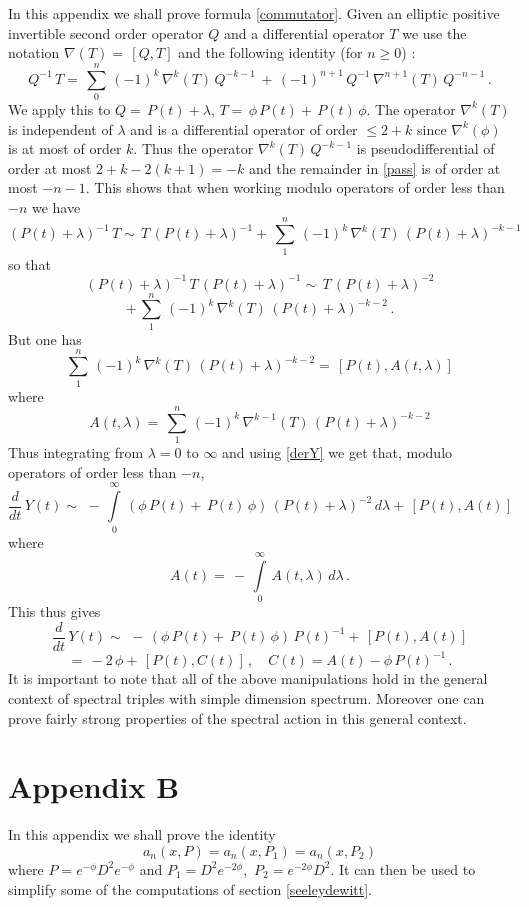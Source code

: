 \documentclass[12pt]{article}%
\begin{document}
In this appendix we shall prove formula \eqref{commutator}. Given an elliptic
positive invertible second order operator $Q$ and a differential operator $T$
we use the notation $\nabla(T)=\,[Q,T]$ and the following identity (for $n
\geq0$) :
\begin{equation}
\label{pass}Q^{-1}\,T=\,\sum_{0}^{n}\,(-1)^{k} \,\nabla^{k}(T)\,Q^{-k-1}%
\,+\,(-1)^{n+1}\,Q^{-1}\,\nabla^{n+1}(T)\,Q^{-n-1}\,.
\end{equation}
We apply this to $Q=\,P(t)+\lambda$, $T=\,\phi\,P(t)+\,P(t)\,\phi$. The
operator $\nabla^{k}(T)$ is independent of $\lambda$ and is a differential
operator of order $\leq2 + k$ since $\nabla^{k}(\phi)$ is at most of order
$k$. Thus the operator $\nabla^{k}(T)\,Q^{-k-1}$ is pseudodifferential of
order at most $2 + k -2(k+1)=-k$ and the remainder in \eqref{pass} is of order
at most $-n-1$. This shows that when working modulo operators of order less
than $-n$ we have
\[
(P(t)+\lambda)^{-1}\,T\sim\,T\,(P(t)+\lambda)^{-1}+\,\sum_{1}^{n}\,(-1)^{k}
\,\nabla^{k}(T)\,(P(t)+\lambda)^{-k-1}
\]
so that
\[
(P(t)+\lambda)^{-1}\,T\,(P(t)+\lambda)^{-1}\sim\,T\,(P(t)+\lambda)^{-2}
\]
\[
+\,\sum_{1}^{n}\,(-1)^{k} \,\nabla^{k}(T)\,(P(t)+\lambda)^{-k-2}\,.
\]
But one has
\[
\sum_{1}^{n}\,(-1)^{k} \,\nabla^{k}(T)\,(P(t)+\lambda)^{-k-2}%
=\,[P(t),A(t,\lambda)]
\]
where
\[
A(t,\lambda)=\,\sum_{1}^{n}\,(-1)^{k} \,\nabla^{k-1}(T)\,(P(t)+\lambda
)^{-k-2}
\]
Thus integrating from $\lambda=0$ to $\infty$ and using \eqref{derY} we get
that, modulo operators of order less than $-n$,
\[
\frac{d}{dt}\,Y(t)\sim\,\,-\,{\displaystyle\int\limits_{0}^{\infty}}\,
(\phi\,P(t)+\,P(t)\,\phi)\,(P(t)+\lambda)^{-2}\,d\lambda+\,[P(t),A(t)]
\]
where
\[
A(t)=\,-\,{\displaystyle\int\limits_{0}^{\infty}}\,A(t,\lambda)\,d\lambda\,.
\]
This thus gives
\[
\frac{d}{dt}\,Y(t)\sim\,\,-\, (\phi\,P(t)+\,P(t)\,\phi)\,P(t)^{-1}
+\,[P(t),A(t)]
\]
\[
=\, -2 \,\phi+\,[P(t),C(t)]\,,\quad C(t)=A(t)-\phi\,P(t)^{-1}\,.
\]
It is important to note that all of the above manipulations hold in the
general context of spectral triples with simple dimension spectrum. Moreover
one can prove fairly strong properties of the spectral action in this general context.

\section{Appendix B}

\bigskip In this appendix we shall prove the identity
\[
a_{n}\left(  x,P\right)  =a_{n}\left(  x,P_{1}\right)  =a_{n}\left(
x,P_{2}\right)
\]
where $P=e^{-\phi}D^{2}e^{-\phi}$ and $P_{1}=D^{2}e^{-2\phi},$ $P_{2}%
=e^{-2\phi}D^{2}$. It can then be used to simplify some of the computations of
section \ref{seeleydewitt}.
\end{document}
